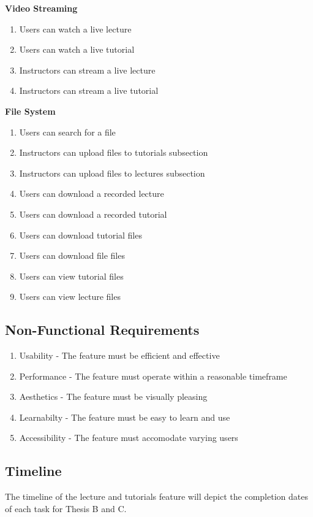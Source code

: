 \textbf{Video Streaming}
    \begin{enumerate}
    \item Users can watch a live lecture
    \item Users can watch a live tutorial
    \item Instructors can stream a live lecture
    \item Instructors can stream a live tutorial
    \end{enumerate}

\textbf{File System}
    \begin{enumerate}
    \item Users can search for a file
    \item Instructors can upload files to tutorials subsection
    \item Instructors can upload files to lectures subsection
    \item Users can download a recorded lecture
    \item Users can download a recorded tutorial
    \item Users can download tutorial files
    \item Users can download file files
    \item Users can view tutorial files
    \item Users can view lecture files
    \end{enumerate}

\subsection{Non-Functional Requirements}
  \begin{enumerate}
    \item Usability - The feature must be efficient and effective
    \item Performance - The feature must operate within a reasonable timeframe
    \item Aesthetics - The feature must be visually pleasing
    \item Learnabilty - The feature must be easy to learn and use
    \item Accessibility - The feature must accomodate varying users
    \end{enumerate}

\subsection{Timeline}
The timeline of the lecture and tutorials feature will depict the completion dates of each task for Thesis B and C.

